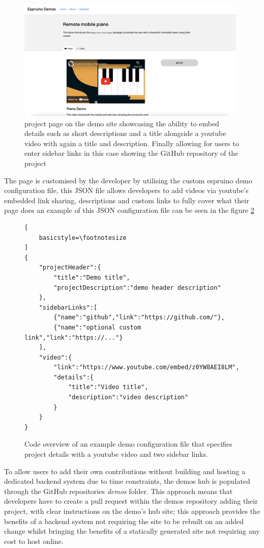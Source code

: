 \documentclass{l4proj}
\begin{document}
\begin{figure}[!ht]
    \centering
    \includegraphics[width=11cm]{dissertation/images/demo-page.png}
    \caption{project page on the demo site showcasing the ability to embed details such as short descriptions and a title alongside a youtube video with again a title and description. Finally allowing for users to enter sidebar links in this case showing the GitHub repository of the project}
    \label{fig:demo-page}
\end{figure}

The page is customised by the developer by utilising the custom espruino demo configuration file, this JSON file allows developers to add videos via youtube's embedded link sharing, descriptions and custom links to fully cover what their page does an example of this JSON configuration file can be seen in the figure \ref{fig:demo-config}

\begin{figure}[H]
    \centering
    \begin{minipage}{10cm}
    \begin{lstlisting}[
    basicstyle=\footnotesize
]
{
    "projectHeader":{
        "title":"Demo title",
        "projectDescription":"demo header description"
    },
    "sidebarLinks":[
        {"name":"github","link":"https://github.com/"},
        {"name":"optional custom link","link":"https://..."}
    ],
    "video":{
        "link":"https://www.youtube.com/embed/z0YW8AEI8LM",
        "details":{
            "title":"Video title",
            "description":"video description"
        }
    }
}
    \end{lstlisting}
    \end{minipage}
    \caption{Code overview of an example demo configuration file that specifies project details with a youtube video and two sidebar links.}
    \label{fig:demo-config}
\end{figure}


To allow users to add their own contributions without building and hosting a dedicated backend system due to time constraints, the demos hub is populated through the GitHub repositories \textit{demos} folder. This approach means that developers have to create a pull request within the demos repository adding their project, with clear instructions on the demo's hub site; this approach provides the benefits of a backend system not requiring the site to be rebuilt on an added change whilst bringing the benefits of a statically generated site not requiring any cost to host online.
\end{document}
